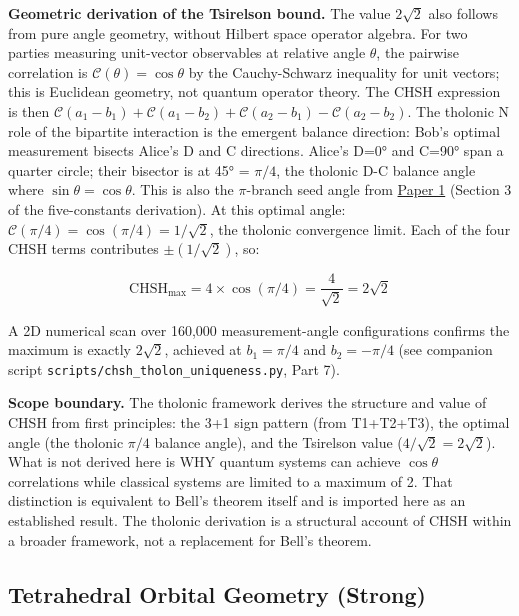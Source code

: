 \documentclass[12pt]{article}
\begin{document}
\textbf{Geometric derivation of the Tsirelson bound.} The value
\(2\sqrt{2}\) also follows from pure angle geometry, without Hilbert
space operator algebra. For two parties measuring unit-vector
observables at relative angle \(\theta\), the pairwise correlation is
\(\mathcal{C}(\theta) = \cos\theta\) by the Cauchy-Schwarz inequality
for unit vectors; this is Euclidean geometry, not quantum operator
theory. The CHSH expression is then
\(\mathcal{C}(a_1-b_1) + \mathcal{C}(a_1-b_2) + \mathcal{C}(a_2-b_1) - \mathcal{C}(a_2-b_2)\).
The tholonic N role of the bipartite interaction is the emergent balance
direction: Bob's optimal measurement bisects Alice's D and C directions.
Alice's D=0° and C=90° span a quarter circle; their bisector is at 45° =
\(\pi/4\), the tholonic D-C balance angle where
\(\sin\theta = \cos\theta\). This is also the \(\pi\)-branch seed angle
from
\href{https://github.com/baardev/truevalue/blob/main/docnav/Research/papers/1_recursive-tholonic-five-constants/1_recursive-tholonic-five-constants.pdf}{Paper
1} (Section 3 of the five-constants derivation). At this optimal angle:
\(\mathcal{C}(\pi/4) = \cos(\pi/4) = 1/\sqrt{2}\), the tholonic
convergence limit. Each of the four CHSH terms contributes
\(\pm(1/\sqrt{2})\), so:

\[\mathrm{CHSH}_{\max} = 4 \times \cos(\pi/4) = \frac{4}{\sqrt{2}} = 2\sqrt{2}\]

A 2D numerical scan over 160,000 measurement-angle configurations
confirms the maximum is exactly \(2\sqrt{2}\), achieved at
\(b_1 = \pi/4\) and \(b_2 = -\pi/4\) (see companion script
\texttt{scripts/chsh\_tholon\_uniqueness.py}, Part 7).

\textbf{Scope boundary.} The tholonic framework derives the structure
and value of CHSH from first principles: the 3+1 sign pattern (from
T1+T2+T3), the optimal angle (the tholonic \(\pi/4\) balance angle), and
the Tsirelson value (\(4/\sqrt{2} = 2\sqrt{2}\)). What is not derived
here is WHY quantum systems can achieve \(\cos\theta\) correlations
while classical systems are limited to a maximum of 2. That distinction
is equivalent to Bell's theorem itself and is imported here as an
established result. The tholonic derivation is a structural account of
CHSH within a broader framework, not a replacement for Bell's theorem.

\subsection{Tetrahedral Orbital Geometry (Strong)}\label{tetrahedral-orbital-geometry-strong}
\end{document}
